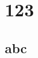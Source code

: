 \begin{appendices}
\chapter{}
\label{appendix:text}
\lipsum

\chapter{123}
\label{appendix:text1}
\lipsum[4]
\section{abc}
\lipsum[3]

\end{appendices}